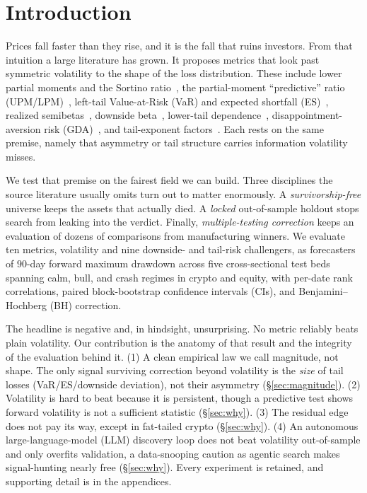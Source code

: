 \documentclass[sigconf,nonacm]{acmart}
\begin{document}

\maketitle

\section{Introduction}
Prices fall faster than they rise, and it is the fall that ruins investors. From
that intuition a large literature has grown. It proposes metrics that look past
symmetric volatility to the shape of the loss distribution. These include
lower partial moments and the Sortino ratio~\cite{bawa1975,fishburn1977,sortino1991},
the partial-moment ``predictive'' ratio (UPM/LPM)~\cite{violenawrocki2016}, left-tail
Value-at-Risk (VaR) and expected shortfall (ES)~\cite{rockafellar2000,atilgan2020}, realized
semibetas~\cite{bpq2022}, downside beta~\cite{ang2006,leviwelch2020}, lower-tail
dependence~\cite{chabiyo2018}, disappointment-aversion risk (GDA)~\cite{faragotedongap2018},
and tail-exponent factors~\cite{kellyjiang2014}. Each rests on the same premise, namely
that asymmetry or tail structure carries information volatility misses.

We test that premise on the fairest field we can build. Three disciplines the
source literature usually omits turn out to matter enormously. A
\emph{survivorship-free} universe keeps the assets that actually died. A
\emph{locked} out-of-sample holdout stops search from leaking into the verdict. Finally,
\emph{multiple-testing correction} keeps an evaluation of dozens of comparisons from
manufacturing winners. We evaluate ten metrics, volatility and nine downside- and
tail-risk challengers, as forecasters of $90$-day forward
maximum drawdown across five cross-sectional test beds spanning calm, bull, and
crash regimes in crypto and equity, with per-date rank correlations, paired
block-bootstrap confidence intervals (CIs), and Benjamini--Hochberg (BH) correction.

The headline is negative and, in hindsight, unsurprising. No metric reliably beats
plain volatility. Our contribution is the anatomy of that result and the
integrity of the evaluation behind it. (1) A clean empirical law we call magnitude, not shape. The only signal surviving correction beyond volatility is the \emph{size}
of tail losses (VaR/ES/downside deviation), not their asymmetry (\S\ref{sec:magnitude}).
(2) Volatility is hard to beat because it is persistent, though a predictive
test shows forward volatility is not a sufficient statistic (\S\ref{sec:why}). (3) The
residual edge does not pay its way, except in fat-tailed crypto (\S\ref{sec:why}).
(4) An autonomous large-language-model (LLM) discovery loop does not beat volatility
out-of-sample and only overfits validation, a data-snooping caution as agentic
search makes signal-hunting nearly free (\S\ref{sec:why}). Every experiment is
retained, and supporting detail is in the appendices.
\end{document}
